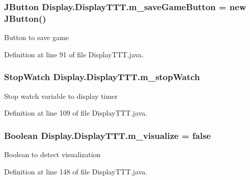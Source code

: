 \subsubsection[{m\+\_\+save\+Game\+Button}]{\setlength{\rightskip}{0pt plus 5cm}J\+Button Display.\+Display\+T\+T\+T.\+m\+\_\+save\+Game\+Button = new J\+Button()\hspace{0.3cm}{\ttfamily [private]}}\label{class_display_1_1_display_t_t_t_afbd113d4a9cd8573238108344561f62c}
Button to save game 

Definition at line 91 of file Display\+T\+T\+T.\+java.

\hypertarget{class_display_1_1_display_t_t_t_ab640a3b08cb9f98d5a9481e45653b49f}{}
\subsubsection[{m\+\_\+stop\+Watch}]{\setlength{\rightskip}{0pt plus 5cm}Stop\+Watch Display.\+Display\+T\+T\+T.\+m\+\_\+stop\+Watch\hspace{0.3cm}{\ttfamily [private]}}\label{class_display_1_1_display_t_t_t_ab640a3b08cb9f98d5a9481e45653b49f}
Stop watch variable to display timer 

Definition at line 109 of file Display\+T\+T\+T.\+java.

\hypertarget{class_display_1_1_display_t_t_t_a92b6a913aec2926f4fdf565a4146bb31}{}
\subsubsection[{m\+\_\+visualize}]{\setlength{\rightskip}{0pt plus 5cm}Boolean Display.\+Display\+T\+T\+T.\+m\+\_\+visualize = false\hspace{0.3cm}{\ttfamily [private]}}\label{class_display_1_1_display_t_t_t_a92b6a913aec2926f4fdf565a4146bb31}
Boolean to detect visualization 

Definition at line 148 of file Display\+T\+T\+T.\+java.

\hypertarget{class_display_1_1_display_t_t_t_a06c277ab266ff9c323c13e1fd50299d2}{}
